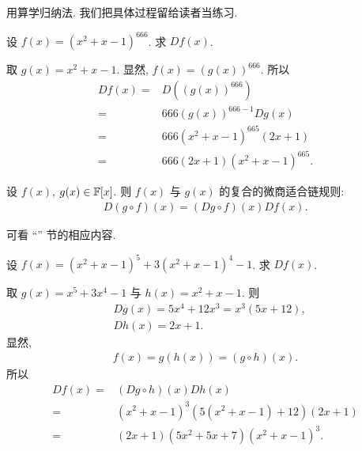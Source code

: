 \begin{pf}
    用算学归纳法. 我们把具体过程留给读者当练习.
\end{pf}

\begin{example}
    设 $f(x) = (x^2 + x - 1)^{666}$. 求 $Df(x)$.

    取 $g(x) = x^2 + x - 1$. 显然, $f(x) = (g(x))^{666}$. 所以
    \begin{align*}
        Df(x)
        = {} & D((g(x))^{666})                   \\
        = {} & 666 (g(x))^{666 - 1} Dg(x)        \\
        = {} & 666 (x^2 + x - 1)^{665} (2x + 1)  \\
        = {} & 666 (2x + 1) (x^2 + x - 1)^{665}.
    \end{align*}
\end{example}

\begin{proposition}
    设 $f(x)$, $g(x) \in \mathbb{F}[x]$. 则 $f(x)$ 与 $g(x)$ 的复合的微商适合链规则:
    \begin{align*}
        D(g \circ f) (x) = (Dg \circ f)(x) Df (x).
    \end{align*}
\end{proposition}

\begin{pf}
    可看 ``\Derivatives '' 节的相应内容.
\end{pf}

\begin{example}
    设 $f(x) = (x^2 + x - 1)^5 + 3 (x^2 + x - 1)^4 - 1$. 求 $Df(x)$.

    取 $g(x) = x^5 + 3x^4 - 1$ 与 $h(x) = x^2 + x - 1$. 则
    \begin{align*}
         & Dg(x) = 5x^4 + 12x^3 = x^3 (5x + 12), \\
         & Dh(x) = 2x + 1.
    \end{align*}
    显然,
    \begin{align*}
        f(x) = g(h(x)) = (g \circ h) (x).
    \end{align*}
    所以
    \begin{align*}
        Df(x)
        = {} & (Dg \circ h)(x) Dh(x)                          \\
        = {} & (x^2 + x - 1)^3 (5(x^2 + x - 1) + 12) (2x + 1) \\
        = {} & (2x + 1) (5x^2 + 5x + 7) (x^2 + x - 1)^3.
    \end{align*}
\end{example}
